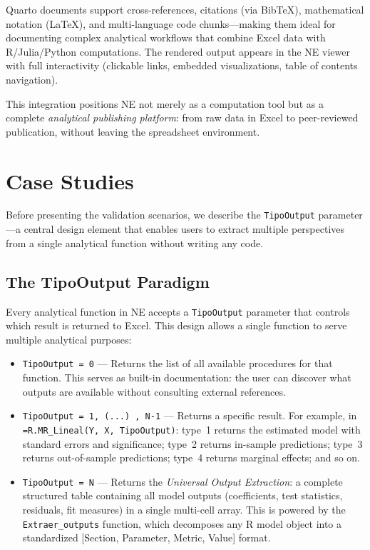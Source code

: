 \documentclass[preprint,12pt,authoryear]{elsarticle}
\newcommand{\neven}{NE\raisebox{0.2ex}{v}\rotatebox[origin=c]{180}{E}\rotatebox[origin=c]{180}{N}}
\begin{document}
Quarto documents support cross-references, citations (via BibTeX), mathematical notation (LaTeX), and multi-language code chunks---making them ideal for documenting complex analytical workflows that combine Excel data with R/Julia/Python computations. The rendered output appears in the \neven{} viewer with full interactivity (clickable links, embedded visualizations, table of contents navigation).

This integration positions \neven{} not merely as a computation tool but as a complete \emph{analytical publishing platform}: from raw data in Excel to peer-reviewed publication, without leaving the spreadsheet environment.


\section{Case Studies}
\label{sec:case_studies}

Before presenting the validation scenarios, we describe the \texttt{TipoOutput} parameter---a central design element that enables users to extract multiple perspectives from a single analytical function without writing any code.

\subsection{The TipoOutput Paradigm}
\label{subsec:tipooutput}

Every analytical function in \neven{} accepts a \texttt{TipoOutput} parameter that controls which result is returned to Excel. This design allows a single function to serve multiple analytical purposes:

\begin{itemize}
    \item \texttt{TipoOutput = 0} --- Returns the list of all available procedures for that function. This serves as built-in documentation: the user can discover what outputs are available without consulting external references.
    \item \texttt{TipoOutput = 1, (...) , N-1} --- Returns a specific result. For example, in \texttt{=R.MR\_Lineal(Y, X, TipoOutput)}: type~1 returns the estimated model with standard errors and significance; type~2 returns in-sample predictions; type~3 returns out-of-sample predictions; type~4 returns marginal effects; and so on.
    \item \texttt{TipoOutput = N} --- Returns the \emph{Universal Output Extraction}: a complete structured table containing all model outputs (coefficients, test statistics, residuals, fit measures) in a single multi-cell array. This is powered by the \texttt{Extraer\_outputs} function, which decomposes any R model object into a standardized [Section, Parameter, Metric, Value] format.
\end{itemize}
\end{document}
